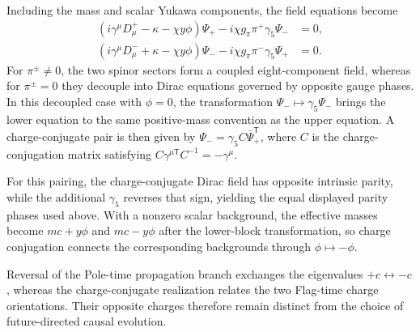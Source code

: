 Including the mass and scalar Yukawa components, the field equations become
\begin{subequations}\label{eq_pion_coupled_sectors}
    \begin{align}
        \left(i\gamma^{\mu}D_{\mu}^{+} - \kappa - \chi y\phi\right)\Psi_{+} - i\chi g_{\pi}\pi^{+}\gamma_{5}\Psi_{-} &= 0,\\
        \left(i\gamma^{\mu}D_{\mu}^{-} + \kappa - \chi y\phi\right)\Psi_{-} - i\chi g_{\pi}\pi^{-}\gamma_{5}\Psi_{+} &= 0.
    \end{align}
\end{subequations}
For $\pi^{\pm}\neq0$, the two spinor sectors form a coupled eight-component field, whereas for $\pi^{\pm}=0$ they decouple into Dirac equations governed by opposite gauge phases. In this decoupled case with $\phi=0$, the transformation $\Psi_{-}\mapsto\gamma_{5}\Psi_{-}$ brings the lower equation to the same positive-mass convention as the upper equation. A charge-conjugate pair is then given by $\Psi_{-}=\gamma_{5}C\bar{\Psi}_{+}^{\mathsf T}$, where $C$ is the charge-conjugation matrix satisfying $C\gamma^{\mu\mathsf T}C^{-1}=-\gamma^{\mu}$.

For this pairing, the charge-conjugate Dirac field has opposite intrinsic parity, while the additional $\gamma_{5}$ reverses that sign, yielding the equal displayed parity phases used above. With a nonzero scalar background, the effective masses become $mc+y\phi$ and $mc-y\phi$ after the lower-block transformation, so charge conjugation connects the corresponding backgrounds through $\phi\mapsto-\phi$.

Reversal of the Pole-time propagation branch exchanges the eigenvalues $+c \leftrightarrow -c$, whereas the charge-conjugate realization relates the two Flag-time charge orientations. Their opposite charges therefore remain distinct from the choice of future-directed causal evolution.

